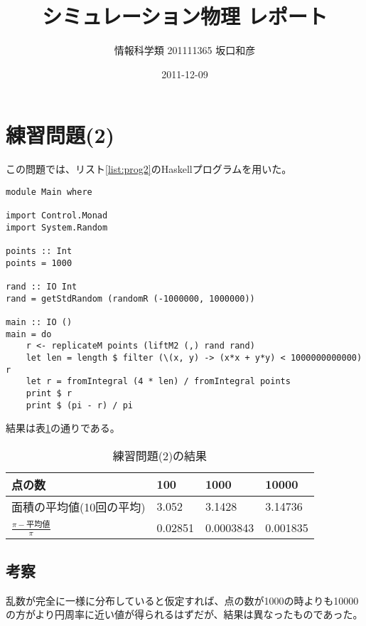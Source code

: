 \documentclass{jsarticle}
\title{シミュレーション物理 レポート}
\author{情報科学類 201111365 坂口和彦}
\date{2011-12-09}
\begin{document}
\maketitle

\section{練習問題(2)}

この問題では、リスト\ref{list:prog2}のHaskellプログラムを用いた。

\begin{lstlisting}[label=list:prog2, caption=練習問題(2)のプログラム]
module Main where

import Control.Monad
import System.Random

points :: Int
points = 1000

rand :: IO Int
rand = getStdRandom (randomR (-1000000, 1000000))

main :: IO ()
main = do
    r <- replicateM points (liftM2 (,) rand rand)
    let len = length $ filter (\(x, y) -> (x*x + y*y) < 1000000000000) r
    let r = fromIntegral (4 * len) / fromIntegral points
    print $ r
    print $ (pi - r) / pi
\end{lstlisting}

結果は表\ref{table:prog2}の通りである。

\begin{table}[htb]

\begin{center}
\begin{tabular}{|l|l|l|l|}\hline
点の数                              & 100     & 1000      & 10000    \\\hline
面積の平均値(10回の平均)            & 3.052   & 3.1428    & 3.14736  \\\hline
$\frac{\pi - \textrm{平均値}}{\pi}$ & 0.02851 & 0.0003843 & 0.001835 \\\hline
\end{tabular}
\end{center}

\label{table:prog2}

\caption{練習問題(2)の結果}

\end{table}

\subsection{考察}

乱数が完全に一様に分布していると仮定すれば、点の数が1000の時よりも10000の方がより円周率に近い値が得られるはずだが、結果は異なったものであった。
\end{document}
